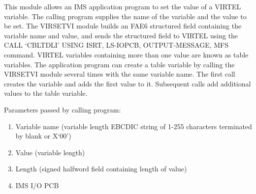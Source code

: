 \documentclass[letterpaper,10pt,english]{sphinxmanual}
\begin{document}


This module allows an IMS application program to set the value of a VIRTEL variable. The calling program supplies the
name of the variable and the value to be set. The VIRSETVI module builds an FAE6 structured field containing the
variable name and value, and sends the structured field to VIRTEL using the CALL ‘CBLTDLI’ USING ISRT, LS-IOPCB,
OUTPUT-MESSAGE, MFS command.
VIRTEL variables containing more than one value are known as table variables. The application program can create a
table variable by calling the VIRSETVI module several times with the same variable name. The first call creates the
variable and adds the first value to it. Subsequent calls add additional values to the table variable.


Parameters passed by calling program:
\begin{enumerate}
\item {} 
Variable name (variable length EBCDIC string of 1-255 characters terminated by blank or X‘00’)

\item {} 
Value (variable length)

\item {} 
Length (signed halfword field containing length of value)

\item {} 
IMS I/O PCB

\end{enumerate}

\end{document}
